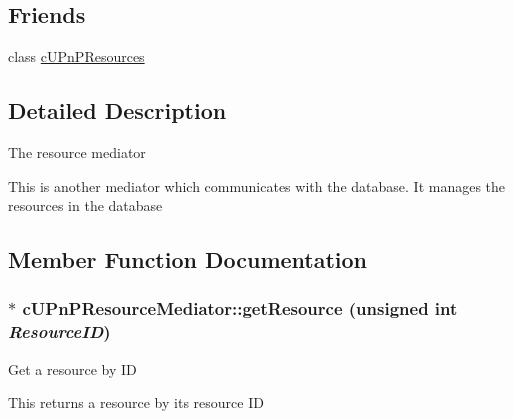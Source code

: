 \subsection*{Friends}
\begin{CompactItemize}
\item 
\hypertarget{classcUPnPResourceMediator_bd3fceb5edae16f35b23748913128356}{
class \hyperlink{classcUPnPResourceMediator_bd3fceb5edae16f35b23748913128356}{cUPnPResources}}
\label{classcUPnPResourceMediator_bd3fceb5edae16f35b23748913128356}

\end{CompactItemize}


\subsection{Detailed Description}
The resource mediator

This is another mediator which communicates with the database. It manages the resources in the database 

\subsection{Member Function Documentation}
\hypertarget{classcUPnPResourceMediator_9d4d8cc5eafb18b13ad7d14793d3f9de}{
\subsubsection[{getResource}]{ $\ast$ cUPnPResourceMediator::getResource (unsigned int {\em ResourceID})}}
\label{classcUPnPResourceMediator_9d4d8cc5eafb18b13ad7d14793d3f9de}


Get a resource by ID

This returns a resource by its resource ID

